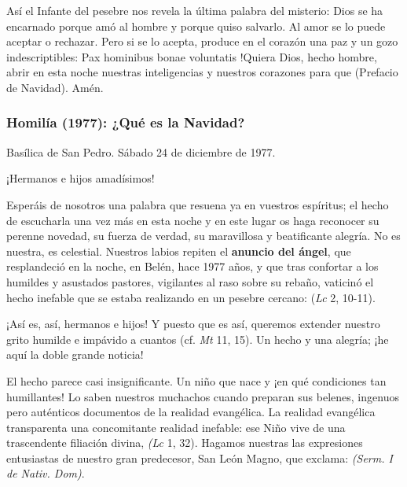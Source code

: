 Así el Infante del pesebre nos revela la última palabra del misterio: Dios se ha encarnado porque amó al hombre y porque quiso salvarlo. Al amor se lo puede aceptar o rechazar. Pero si se lo acepta, produce en el corazón una paz y un gozo indescriptibles: Pax hominibus bonae voluntatis !Quiera Dios, hecho hombre, abrir en esta noche nuestras inteligencias y nuestros corazones para que  (Prefacio de Navidad). Amén.

\subsubsection{Homilía (1977): ¿Qué es la Navidad?}

Basílica de San Pedro. Sábado 24 de diciembre de 1977.

¡Hermanos e hijos amadísimos!

Esperáis de nosotros una palabra que resuena ya en vuestros espíritus; el hecho de escucharla una vez más en esta noche y en este lugar os haga reconocer su perenne novedad, su fuerza de verdad, su maravillosa y beatificante alegría. No es nuestra, es celestial. Nuestros labios repiten el \textbf{anuncio del ángel}, que resplandeció en la noche, en Belén, hace 1977 años, y que tras confortar a los humildes y asustados pastores, vigilantes al raso sobre su rebaño, vaticinó el hecho inefable que se estaba realizando en un pesebre cercano:  (\emph{Lc} 2, 10-11).

¡Así es, así, hermanos e hijos! Y puesto que es así, queremos extender nuestro grito humilde e impávido a cuantos  (cf. \emph{Mt} 11, 15). Un hecho y una alegría; ¡he aquí la doble grande noticia!

El hecho parece casi insignificante. Un niño que nace y ¡en qué condiciones tan humillantes! Lo saben nuestros muchachos cuando preparan sus belenes, ingenuos pero auténticos documentos de la realidad evangélica. La realidad evangélica transparenta una concomitante realidad inefable: ese Niño vive de una trascendente filiación divina,  \emph{(Lc} 1, 32). Hagamos nuestras las expresiones entusiastas de nuestro gran predecesor, San León Magno, que exclama:  \emph{(Serm. I de Nativ. Dom)}.

